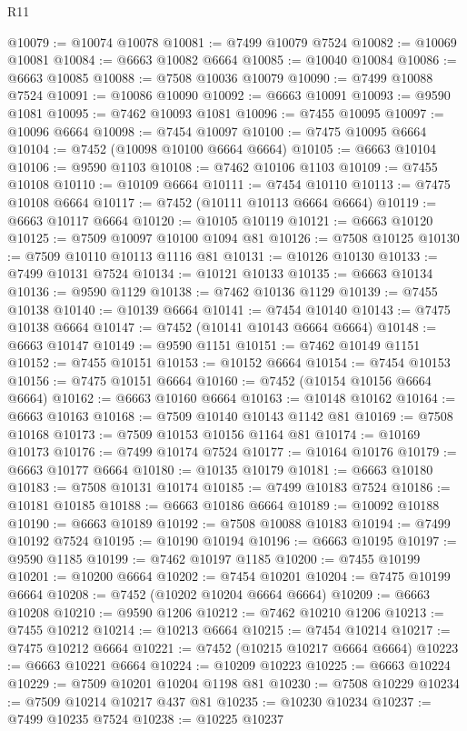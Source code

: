 \begin{lexlean}{R11}
\begin{coremodule}
@10079 := @10074 @10078
@10081 := @7499 @10079 @7524
@10082 := @10069 @10081
@10084 := @6663 @10082 @6664
@10085 := @10040 @10084
@10086 := @6663 @10085
@10088 := @7508 @10036 @10079
@10090 := @7499 @10088 @7524
@10091 := @10086 @10090
@10092 := @6663 @10091
@10093 := @9590 @1081
@10095 := @7462 @10093 @1081
@10096 := @7455 @10095
@10097 := @10096 @6664
@10098 := @7454 @10097
@10100 := @7475 @10095 @6664
@10104 := @7452 (@10098 @10100 @6664 @6664)
@10105 := @6663 @10104
@10106 := @9590 @1103
@10108 := @7462 @10106 @1103
@10109 := @7455 @10108
@10110 := @10109 @6664
@10111 := @7454 @10110
@10113 := @7475 @10108 @6664
@10117 := @7452 (@10111 @10113 @6664 @6664)
@10119 := @6663 @10117 @6664
@10120 := @10105 @10119
@10121 := @6663 @10120
@10125 := @7509 @10097 @10100 @1094 @81
@10126 := @7508 @10125
@10130 := @7509 @10110 @10113 @1116 @81
@10131 := @10126 @10130
@10133 := @7499 @10131 @7524
@10134 := @10121 @10133
@10135 := @6663 @10134
@10136 := @9590 @1129
@10138 := @7462 @10136 @1129
@10139 := @7455 @10138
@10140 := @10139 @6664
@10141 := @7454 @10140
@10143 := @7475 @10138 @6664
@10147 := @7452 (@10141 @10143 @6664 @6664)
@10148 := @6663 @10147
@10149 := @9590 @1151
@10151 := @7462 @10149 @1151
@10152 := @7455 @10151
@10153 := @10152 @6664
@10154 := @7454 @10153
@10156 := @7475 @10151 @6664
@10160 := @7452 (@10154 @10156 @6664 @6664)
@10162 := @6663 @10160 @6664
@10163 := @10148 @10162
@10164 := @6663 @10163
@10168 := @7509 @10140 @10143 @1142 @81
@10169 := @7508 @10168
@10173 := @7509 @10153 @10156 @1164 @81
@10174 := @10169 @10173
@10176 := @7499 @10174 @7524
@10177 := @10164 @10176
@10179 := @6663 @10177 @6664
@10180 := @10135 @10179
@10181 := @6663 @10180
@10183 := @7508 @10131 @10174
@10185 := @7499 @10183 @7524
@10186 := @10181 @10185
@10188 := @6663 @10186 @6664
@10189 := @10092 @10188
@10190 := @6663 @10189
@10192 := @7508 @10088 @10183
@10194 := @7499 @10192 @7524
@10195 := @10190 @10194
@10196 := @6663 @10195
@10197 := @9590 @1185
@10199 := @7462 @10197 @1185
@10200 := @7455 @10199
@10201 := @10200 @6664
@10202 := @7454 @10201
@10204 := @7475 @10199 @6664
@10208 := @7452 (@10202 @10204 @6664 @6664)
@10209 := @6663 @10208
@10210 := @9590 @1206
@10212 := @7462 @10210 @1206
@10213 := @7455 @10212
@10214 := @10213 @6664
@10215 := @7454 @10214
@10217 := @7475 @10212 @6664
@10221 := @7452 (@10215 @10217 @6664 @6664)
@10223 := @6663 @10221 @6664
@10224 := @10209 @10223
@10225 := @6663 @10224
@10229 := @7509 @10201 @10204 @1198 @81
@10230 := @7508 @10229
@10234 := @7509 @10214 @10217 @437 @81
@10235 := @10230 @10234
@10237 := @7499 @10235 @7524
@10238 := @10225 @10237

\end{coremodule}
\end{lexlean}

